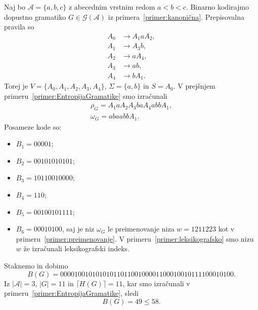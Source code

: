 \documentclass[fin1, tisk]{fmfdelo}
\providecommand{\abs}[1]{\left\lvert #1 \right\rvert}
\newcommand{\A}{\mathcal{A}}
\newcommand{\G}{\mathcal{G}}
\theoremstyle{definition}
\begin{document}
\begin{primer}
    Naj bo $\A = \{ a, b, c\}$ z abecednim vrstnim redom $a < b < c$. Binarno kodirajmo dopustno 
    gramatiko $G \in \G(\A)$ iz primera~\ref{primer:kanonična}. Prepisovalna pravila so
    \begin{align*}
        A_0 &\rightarrow A_1aA_2, \\
        A_1 &\rightarrow A_3b, \\
        A_2 &\rightarrow aA_4, \\
        A_3 &\rightarrow ab, \\
        A_4 &\rightarrow bA_1.
    \end{align*}
    Torej je $V = \{ A_0, A_1, A_2, A_3, A_4 \}$, $\Sigma  = \{ a, b \}$ in $S=A_0$. V prejšnjem 
    primeru~\ref{primer:EntropijaGramatike} smo izračunali
    \begin{gather*}
        \rho_G = A_1aA_2A_3baA_4abbA_1, \\
        \omega_G = abaabbA_1.
    \end{gather*}
    Posameze kode so:
    \begin{itemize}
        \item $B_1 = 00001$;
        \item $B_2 = 00101010101$;
        \item $B_3 = 10110010000$;
        \item $B_4 = 110$;
        \item $B_5 = 00100101111$;
        \item $B_6 = 00010100$, saj je niz $\omega_G$ le preimenovanje niza $w = 1211223$
        kot v primeru~\ref{primer:preimenovanje}. V primeru~\ref{primer:leksikografsko} smo nizu
        $w$ že izračunali leksikografski indeks.

    \end{itemize}
    Staknemo in dobimo
    \[
        B(G) = 00001 00101010101 10110010000 110 00100101111 00010100.
    \]
    Iz $\abs{\A} = 3$, $\abs{G} = 11$ in $\lceil H(G) \rceil = 11$, kar smo izračunali v 
    primeru~\ref{primer:EntropijaGramatike}, sledi
    \[
        B(G) = 49 \leq 58.
    \]


\end{primer}
\end{document}
